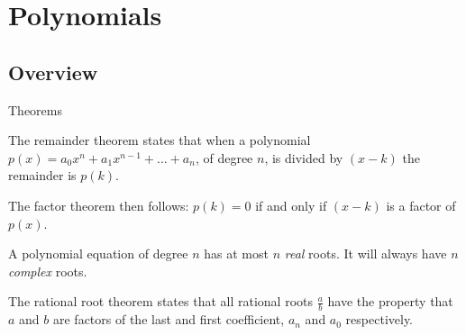 \section{Polynomials}
\subsection{Overview}
\begin{namedframe}{Theorems}
	\begin{theorem}
		The remainder theorem states that when a polynomial $p(x) = a_0x^n + a_1x^{n-1} + \dots + a_n$, of degree $n$, is divided by $(x-k)$ the remainder is $p(k)$.

		The factor theorem then follows: $p(k) = 0$ if and only if $(x - k)$ is a factor of $p(x)$.

		A polynomial equation of degree $n$ has at most $n$ \emph{real} roots.
		It will always have $n$ \emph{complex} roots.
	\end{theorem}
	\begin{theorem}
		The rational root theorem states that all rational roots $\frac{a}{b}$ have the property that $a$ and $b$ are factors of the last and first coefficient, $a_n$ and $a_0$ respectively.
	\end{theorem}
\end{namedframe}
